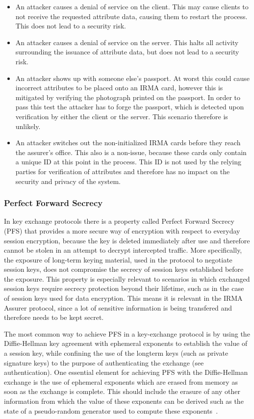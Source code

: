 \begin{itemize}
  \item An attacker causes a denial of service on the client. This may cause clients to not receive the requested attribute data, causing them to restart the process. This does not lead to a security risk.
  \item An attacker causes a denial of service on the server. This halts all activity surrounding the issuance of attribute data, but does not lead to a security risk.
  \item An attacker shows up with someone else's passport. At worst this could cause incorrect attributes to be placed onto an IRMA card, however this is mitigated by verifying the photograph printed on the passport. In order to pass this test the attacker has to forge the passport, which is detected upon verification by either the client or the server. This scenario therefore is unlikely.
  \item An attacker switches out the non-initialized IRMA cards before they reach the assurer's office. This also is a non-issue, because these cards only contain a unique ID at this point in the process. This ID is not used by the relying parties for verification of attributes and therefore has no impact on the security and privacy of the system.
\end{itemize}

\subsubsection{Perfect Forward Secrecy}
\label{subsubsec:pfs}
In key exchange protocols there is a property called Perfect Forward Secrecy (PFS) that provides a more secure way of encryption with respect to everyday session encryption, because the key is deleted immediately after use and therefore cannot be stolen in an attempt to decrypt intercepted traffic. More specifically, the exposure of long-term keying material, used in the protocol to negotiate session keys, does not compromise the secrecy of session keys established before the exposure. This property is especially relevant to scenarios in which exchanged session keys require secrecy protection beyond their lifetime, such as in the case of session keys used for data encryption. This means it is relevant in the IRMA Assurer protocol, since a lot of sensitive information is being transfered and therefore needs to be kept secret.

The most common way to achieve PFS in a key-exchange protocol is by using the Diffie-Hellman key agreement with ephemeral exponents to establish the value of a session key, while confining the use of the longterm keys (such as private signature keys) to the purpose of authenticating the exchange (see authentication). One essential element for achieving PFS with the Diffie-Hellman exchange is the use of ephemeral exponents which are erased from memory as soon as the exchange is complete. This should include the erasure of any other information from which the value of these exponents can be derived such as the state of a pseudo-random generator used to compute these exponents~\cite{PFS}.

